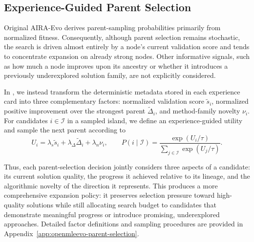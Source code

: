 \subsection{Experience-Guided Parent Selection}

Original AIRA-Evo derives parent-sampling probabilities primarily from
normalized fitness. Consequently, although parent selection remains
stochastic, the search is driven almost entirely by a node's current
validation score and tends to concentrate expansion on already strong
nodes. Other informative signals, such as how much a node improves upon
its ancestry or whether it introduces a previously underexplored solution
family, are not explicitly considered.

In \openmleevo{}, we instead transform the deterministic metadata stored
in each experience card into three complementary factors: normalized
validation score $\tilde{s}_i$, normalized positive improvement over the
strongest parent $\widetilde{\Delta}_i$, and method-family novelty $\nu_i$.
For candidates $i \in \mathcal{I}$ in a sampled island, we define an
experience-guided utility and sample the next parent according to
\begin{equation}
U_i
=
\lambda_s \tilde{s}_i
+
\lambda_{\Delta} \widetilde{\Delta}_i
+
\lambda_n \nu_i,
\qquad
P(i \mid \mathcal{I})
=
\frac{\exp(U_i/\tau)}
{\sum_{j \in \mathcal{I}} \exp(U_j/\tau)}.
\label{eq:openmleevo-parent-selection}
\end{equation}

Thus, each parent-selection decision jointly considers three aspects of a
candidate: its current solution quality, the progress it achieved relative
to its lineage, and the algorithmic novelty of the direction it represents.
This produces a more comprehensive expansion policy: it preserves selection
pressure toward high-quality solutions while still allocating search budget
to candidates that demonstrate meaningful progress or introduce promising,
underexplored approaches. Detailed factor definitions and sampling procedures are provided in
Appendix~\ref{app:openmleevo-parent-selection}.

